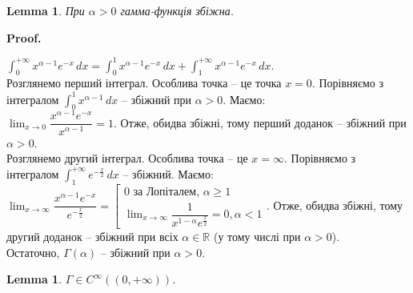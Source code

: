 \documentclass[a4paper, 10pt]{article}
\makeatletter
\def\huge{\displaystyle}
\def\qed{$\blacksquare$}
\theoremstyle{theoremdd}
\theoremstyle{theoremdd}
\theoremstyle{theoremdd}
\theoremstyle{theoremdd}
\theoremstyle{theoremdd}
\theoremstyle{theoremdd}
\theoremstyle{theoremdd}
\theoremstyle{theoremdd}
\newtheorem{lemma}[theorem]{Lemma}
\theoremstyle{theoremdd}
\renewenvironment{proof}[1][Proof.\\]{\par
\pushQED{\hfill \qed}%
\normalfont \topsep6\p@\@plus6\p@\relax
\trivlist
\item\relax
{\bfseries
#1\@addpunct{.}}\hspace\labelsep\ignorespaces
}{%
\popQED\endtrivlist\@endpefalse
}
\makeatother
\begin{document}
\begin{lemma}
При $\alpha > 0$ гамма-функція збіжна.
\end{lemma}

\begin{proof}
$\huge \int_0^{+\infty} x^{\alpha-1}e^{-x}\,dx = \int_0^1 x^{\alpha-1}e^{-x}\,dx + \int_1^{+\infty} x^{\alpha-1}e^{-x}\,dx$.\\
Розглянемо перший інтеграл. Особлива точка -- це точка $x = 0$. Порівняємо з інтегралом $\huge \int_0^1 x^{\alpha-1}\,dx$ -- збіжний при $\alpha > 0$. Маємо:\\
$\huge \lim_{x \to 0} \dfrac{x^{\alpha-1} e^{-x}}{x^{\alpha -1}} = 1$. Отже, обидва збіжні, тому перший доданок -- збіжний при $\alpha > 0$.\\
Розглянемо другий інтеграл. Особлива точка -- це $x = \infty$. Порівняємо з інтегралом $\huge \int_1^{+\infty} e^{-\frac{x}{2}} \,dx$ -- збіжний. Маємо:\\
$\huge \lim_{x \to \infty} \dfrac{x^{\alpha -1} e^{-x}}{ e^{-\frac{x}{2}}} = \left[ \begin{gathered} 0 \textrm{ за Лопіталем, } \alpha \geq 1 \\ \huge \lim_{x \to \infty} \dfrac{1}{x^{1-\alpha} e^{\frac{x}{2}}} = 0, \alpha < 1 \end{gathered} \right.$. Отже, обидва збіжні, тому другий доданок -- збіжний при всіх $\alpha \in \mathbb{R}$ (у тому числі при $\alpha > 0$).\\
Остаточно, $\Gamma(\alpha)$ -- збіжний при $\alpha > 0$.
\end{proof}

\begin{lemma}
$\Gamma \in C^{\infty} ((0,+\infty))$.
\end{lemma}
\end{document}
